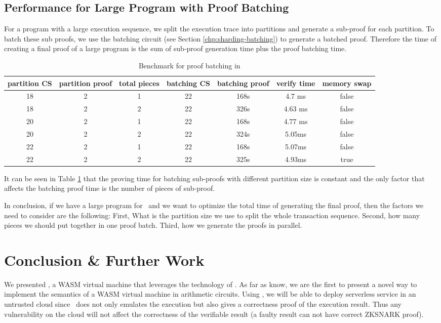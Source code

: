 \subsection{Performance for Large Program with Proof Batching}
For a program with a large execution sequence, we split the execution trace into partitions and generate a sub-proof for each partition. To batch these sub proofs, we use the batching circuit (see Section \ref{chp:sharding-batching}) to generate a batched proof. Therefore the time of creating a final proof of a large program is the sum of sub-proof generation time plus the proof batching time.
\begin{table}[!h]
\small
\begin{center}
\caption{Benchmark for proof batching in \zkwasm}
\label{tbl:proof-batching}
\begin{tabular}{ | c | c | c | c | c | c | c| }
  \hline
  partition CS & partition proof & total pieces& batching CS & batching proof & verify time & memory swap\\ 
  \hline
  18 & 2 & 1 & 22 & 168s & 4.7 ms & false\\
  \hline
  18 & 2 & 2 & 22 & 326s & 4.63 ms & false\\
  \hline
    20 & 2 & 1 & 22 & 168s & 4.77 ms & false \\
  \hline
    20 & 2 & 2 & 22 & 324s & 5.05ms & false\\
  \hline
    22 & 2 & 1 & 22 & 168s & 5.07ms & false\\
  \hline
    22 & 2 & 2 & 22 & 325s & 4.93ms & true \\
  \hline
\end{tabular}
\end{center}
\end{table}
It can be seen in Table \ref{tbl:proof-batching} that the proving time for batching sub-proofs with different partition size is constant and the only factor that affects the batching proof time is the number of pieces of sub-proof. 

In conclusion, if we have a large program for \zkwasm\, and we want to optimize the total time of generating the final proof, then the factors we need to consider are the following: First, What is the partition size we use to split the whole transaction sequence. Second, how many pieces we should put together in one proof batch. Third, how we generate the proofs in parallel.

\section{Conclusion \& Further Work}
\label{chp:conclusion}
We presented \zkwasm, a WASM virtual machine that leverages the technology of \zksnark. As far as know, we are the first to present a novel way to implement the semantics of a WASM virtual machine in arithmetic circuits. Using \zkwasm, we will be able to deploy serverless service in an untrusted cloud since \zkwasm\, does not only emulates the execution but also gives a correctness proof of the execution result. Thus any vulnerability on the cloud will not affect the correctness of the verifiable result (a faulty result can not have correct ZKSNARK proof).

